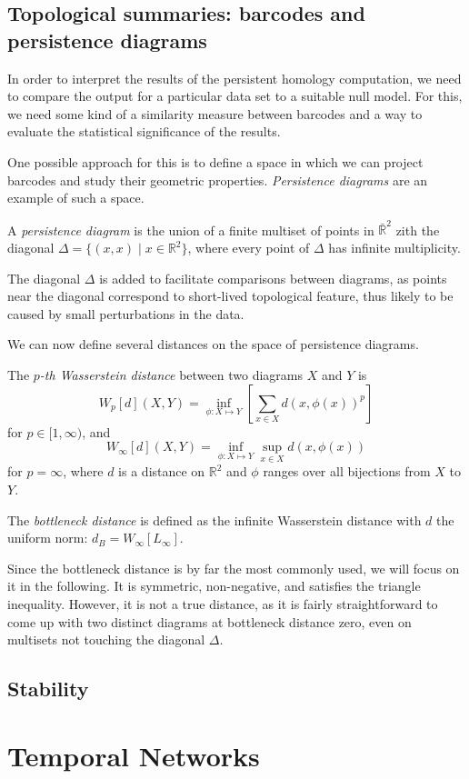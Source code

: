 \documentclass[a4paper,11pt,openany,extrafontsizes]{memoir}
\begin{document}
\section{Topological summaries: barcodes and persistence diagrams}%
\label{sec:topol-summ}

In order to interpret the results of the persistent homology
computation, we need to compare the output for a particular data set
to a suitable null model. For this, we need some kind of a similarity
measure between barcodes and a way to evaluate the statistical
significance of the results.

One possible approach for this is to define a space in which we can
project barcodes and study their geometric
properties. \emph{Persistence diagrams} are an example of such a
space.

\begin{defn}
  A \emph{persistence diagram} is the union of a finite multiset of
  points in $\bar{\mathbb{R}}^2$ zith the diagonal
  $\Delta = \{(x,x) \;|\; x\in\mathbb{R}^2\}$, where every point of
  $\Delta$ has infinite multiplicity.
\end{defn}

The diagonal $\Delta$ is added to facilitate comparisons between
diagrams, as points near the diagonal correspond to short-lived
topological feature, thus likely to be caused by small perturbations
in the data.

We can now define several distances on the space of persistence
diagrams.

\begin{defn}
  The \emph{$p$-th Wasserstein distance} between two diagrams $X$ and
  $Y$ is
  \[ W_p[d](X, Y) = \inf_{\phi:X\mapsto Y} \left[\sum_{x\in X} {d\left(x, \phi(x)\right)}^p\right] \]
  for $p\in [1,\infty)$, and
  \[ W_\infty[d](X, Y) = \inf_{\phi:X\mapsto Y} \sup_{x\in X} d\left(x,
      \phi(x)\right) \] for $p = \infty$, where $d$ is a distance on
  $\mathbb{R}^2$ and $\phi$ ranges over all bijections from $X$ to
  $Y$.
\end{defn}

\begin{defn}
  The \emph{bottleneck distance} is defined as the infinite
  Wasserstein distance with $d$ the uniform norm:
  $d_B = W_\infty[L_\infty]$.
\end{defn}

Since the bottleneck distance is by far the most commonly used, we
will focus on it in the following. It is symmetric, non-negative, and
satisfies the triangle inequality. However, it is not a true distance,
as it is fairly straightforward to come up with two distinct diagrams
at bottleneck distance zero, even on multisets not touching the
diagonal $\Delta$.

\section{Stability}%
\label{sec:stability}



\chapter{Temporal Networks}%
\label{cha:temporal-networks}
\backmatter%

\nocite{*}

%
\label{cha:bibliography}
\end{document}
